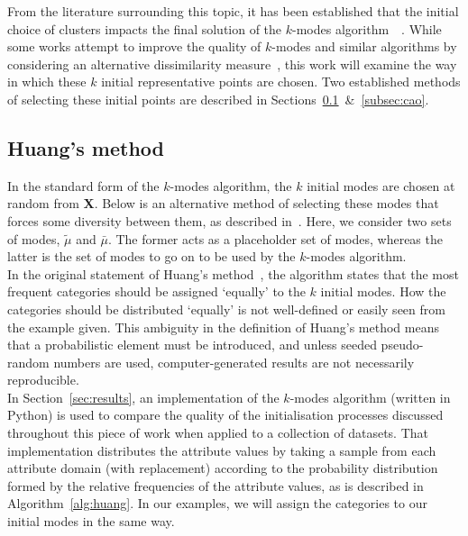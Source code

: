 From the literature surrounding this topic, it has been established that the 
initial choice of clusters impacts the final solution of the \(k\)-modes
algorithm~\cite{Huang98}~\cite{Cao09}. While some works attempt to improve the 
quality of \(k\)-modes and similar algorithms by considering an alternative 
dissimilarity measure~\cite{Ng07}, this work will examine the way in which these
\(k\) initial representative points are chosen. Two established methods of 
selecting these initial points are described in
Sections~\ref{subsec:huang}~\&~\ref{subsec:cao}.\\


\subsection{Huang's method}\label{subsec:huang}

In the standard form of the \(k\)-modes algorithm, the \(k\) initial modes are 
chosen at random from \textbf{X}. Below is an alternative method of selecting
these modes that forces some diversity between them, as described 
in~\cite{Huang98}. Here, we consider two sets of modes, \(\tilde{\mu}\) and
\(\bar{\mu}\). The former acts as a placeholder set of modes, whereas the latter
is the set of modes to go on to be used by the \(k\)-modes algorithm.\\

 

In the original statement of Huang's method~\cite{Huang98}, the algorithm states
that the most frequent categories should be assigned `equally' to the \(k\) 
initial modes. How the categories should be distributed `equally' is not 
well-defined or easily seen from the example given. This ambiguity in the 
definition of Huang's method means that a probabilistic element must be 
introduced, and unless seeded pseudo-random numbers are used, computer-generated results are not necessarily reproducible.\\

In Section~\ref{sec:results}, an implementation of the \(k\)-modes algorithm 
(written in Python) is used to compare the quality of the initialisation 
processes discussed throughout this piece of work when applied to a collection 
of datasets. That implementation distributes the attribute values by taking a
sample from each attribute domain (with replacement) according to the 
probability distribution formed by the relative frequencies of the attribute
values, as is described in Algorithm~\ref{alg:huang}. In our examples, we will
assign the categories to our initial modes in the same way.\\

